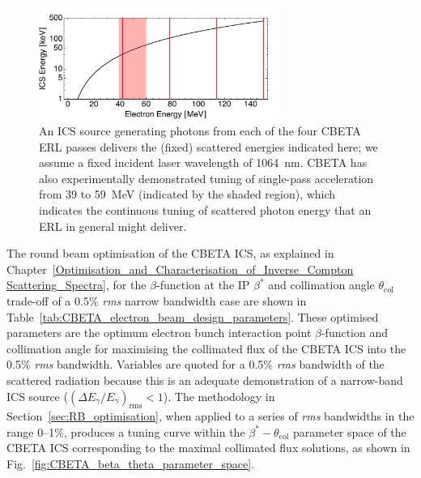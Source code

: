 \documentclass[../main.tex]{subfiles}
\begin{document}
\begin{figure}[!h]
\centering
\includegraphics[width=0.7\textwidth]{Figures/CBETA_Inverse_Compton_Source_Design/CBETA_ICS_energy_tuning.pdf}
\caption{An ICS source generating photons from each of the four CBETA ERL passes delivers the (fixed) scattered energies indicated here; we assume a fixed incident laser wavelength of 1064~\si{\nano\meter}. CBETA has also experimentally demonstrated tuning of single-pass acceleration from 39 to 59~\si{\mega\electronvolt} (indicated by the shaded region), which indicates the continuous tuning of scattered photon energy that an ERL in general might deliver.}
\label{fig:CBETA_ICS_energy_tuning}
\end{figure}

The round beam optimisation of the CBETA ICS, as explained in Chapter~\ref{Optimisation_and_Characterisation_of_Inverse_Compton Scattering_Spectra}, for the $\beta$-function at the IP $\beta^{*}$ and collimation angle $\theta_{\mathrm{col}}$ trade-off of a 0.5\% \textit{rms} narrow bandwidth case are shown in Table~\ref{tab:CBETA_electron_beam_design_parameters}. These optimised parameters are the optimum electron bunch interaction point $\beta$-function and collimation angle for maximising the collimated flux of the CBETA ICS into the 0.5\% \textit{rms} bandwidth. Variables are quoted for a 0.5\% \textit{rms} bandwidth of the scattered radiation because this is an adequate demonstration of a narrow-band ICS source ($\left(\Delta E_{\gamma}/E_{\gamma}\right)_{\mathrm{rms}} < 1$). The methodology in Section~\ref{sec:RB_optimisation}, when applied to a series of \textit{rms} bandwidths in the range 0--1\%, produces a tuning curve within the $\beta^{*}-\theta_{\mathrm{col}}$ parameter space of the CBETA ICS corresponding to the maximal collimated flux solutions, as shown in Fig.~\ref{fig:CBETA_beta_theta_parameter_space}.
\end{document}
